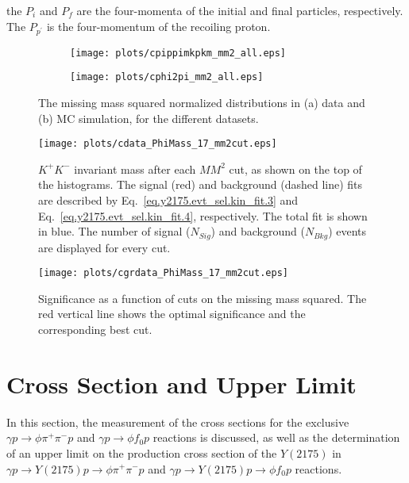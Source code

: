 \noindent the $P_i$ and $P_f$ are the four-momenta of the initial and final particles, respectively. The $P_{p^{\prime}}$ is the four-momentum of the recoiling proton.

\begin{figure}[H]
    \centering
    \begin{subfigure}[b]{0.5\textwidth}
        \texttt{[image: plots/cpippimkpkm\_mm2\_all.eps]}
        \caption{}
        \label{fig.y2175.evt_sel.mis_mass_sqrt.1.a}
    \end{subfigure}\hfill
    \begin{subfigure}[b]{0.5\textwidth}
        \texttt{[image: plots/cphi2pi\_mm2\_all.eps]}
        \caption{}
        \label{fig.y2175.evt_sel.mis_mass_sqrt.1.b}
    \end{subfigure}
    \caption{The missing mass squared normalized distributions in (a) data and (b) MC simulation, for the different datasets.}
    \label{fig.y2175.evt_sel.mis_mass_sqrt.1}
\end{figure}

\begin{figure}[H]
    \centering
        \texttt{[image: plots/cdata\_PhiMass\_17\_mm2cut.eps]}
        \caption{$K^+K^-$ invariant mass after each $MM^2$ cut, as shown on the top of the histograms. The signal (red) and background (dashed line) fits are described by Eq.~\ref{eq.y2175.evt_sel.kin_fit.3} and Eq.~\ref{eq.y2175.evt_sel.kin_fit.4}, respectively. The total fit is shown in blue. The number of signal ($N_{Sig}$) and background ($N_{Bkg}$) events are displayed for every cut.}
        \label{fig.y2175.evt_sel.mis_mass_sqrt.2}
\end{figure}

\begin{figure}[htbp]
    \centering
        \texttt{[image: plots/cgrdata\_PhiMass\_17\_mm2cut.eps]}
        \caption{Significance as a function of cuts on the missing mass squared. The red vertical line shows the optimal significance and the corresponding best cut.}
        \label{fig.y2175.evt_sel.mis_mass_sqrt.3}
\end{figure}

\section{Cross Section and Upper Limit}
\label{chap.y2175.xsec_ul}

In this section, the measurement of the cross sections for the exclusive $\gamma p \rightarrow \phi \pi^+ \pi^- p$ and $\gamma p \rightarrow \phi f_0 p$ reactions is discussed, as well as the determination of an upper limit on the production cross section of the $Y(2175)$ in $\gamma p \rightarrow Y(2175) p \rightarrow \phi \pi^+ \pi^- p$ and $\gamma p \rightarrow Y(2175) p \rightarrow \phi f_0 p$ reactions.

